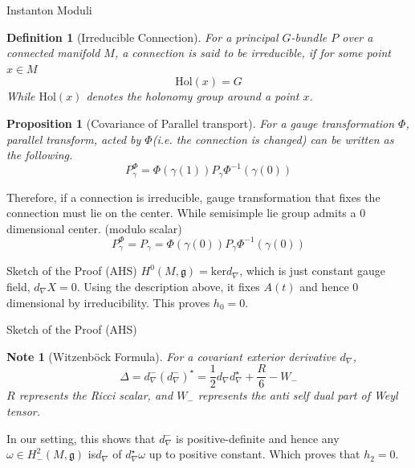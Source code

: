 \documentclass[10pt]{beamer}
\newtheorem{defn}{Definition}
\newtheorem{prop}{Proposition}
\newtheorem{nte}{Note}
\begin{document}
\begin{frame}{Instanton Moduli}
    \begin{defn}[Irreducible Connection]
        For a principal $G$-bundle $P$ over a connected manifold $M$, a connection is said to be irreducible, if for some point $x\in M$
        \[
            \mathrm{Hol}(x) = G
        \]
        While $\mathrm{Hol}(x)$ denotes the holonomy group around a point $x$.
    \end{defn}

    \begin{prop}[Covariance of Parallel transport]
        For a gauge transformation $\Phi$, parallel transform, acted by $\Phi$(i.e. the connection is changed) can be written as the following.
        \[
            P^{\Phi}_\gamma = \Phi(\gamma(1))P_\gamma \Phi^{-1}(\gamma(0))
        \]
    \end{prop}

    Therefore, if a connection is irreducible, gauge transformation that fixes the connection must lie on the center. While semisimple lie group admits a 0 dimensional center. (modulo scalar)
    \[
        P^{\Phi}_\gamma = P_\gamma = \Phi(\gamma(0))P_\gamma\Phi^{-1}(\gamma(0))
    \]
\end{frame}

\begin{frame}{Sketch of the Proof (AHS)}
    $H^0(M,\mathfrak{g})=\mathrm{ker}d_\nabla$, which is just constant gauge field, $d_\nabla X=0$. Using the description above, it fixes $A(t)$ and hence 0 dimensional by irreducibility. This proves $h_0=0$.\\
\end{frame}

\begin{frame}[fragile]{Sketch of the Proof (AHS)}
    \begin{nte}[Witzenböck Formula]
        For a covariant exterior derivative $d_\nabla$, 
        \[
            \Delta= d_\nabla^{-} (d_\nabla^{-})^\star = \frac{1}{2}d_\nabla d_\nabla^\star + \frac{R}{6} - W_-
        \]
        $R$ represents the Ricci scalar, and $W_-$ represents the anti self dual part of Weyl tensor.
    \end{nte}
    In our setting, this shows that $d_\nabla^-$ is positive-definite and hence any $\omega\in H^2_-(M,\mathfrak{g})$ is$d_\nabla$ of $d_\nabla^\star\omega$ up to positive constant. Which proves that $h_2=0$.
\end{frame}
\end{document}
